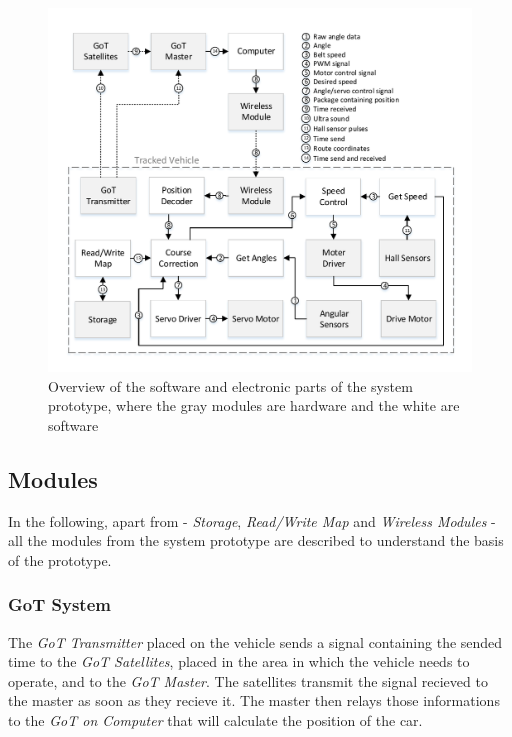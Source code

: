 \begin{figure}[H]
	\centering
	\includegraphics[scale=.9]{figures/systemOverview2}
	\caption{Overview of the software and electronic parts of the system prototype, where the gray modules are hardware and the white are software}
	\label{fig:systemOverview2}
\end{figure}

\subsection{Modules}
In the following, apart from - \textit{Storage}, \textit{Read/Write Map} and \textit{Wireless Modules} - all the modules from the system prototype are described to understand the basis of the prototype.

\subsubsection{GoT System}

The \textit{GoT Transmitter} placed on the vehicle sends a signal containing the sended time to the \textit{GoT Satellites}, placed in the area in which the vehicle needs to operate, and to the \textit{GoT Master}. The satellites transmit the signal recieved to the master as soon as they recieve it. The master then relays those informations to the \textit{GoT on Computer} that will calculate the position of the car.

